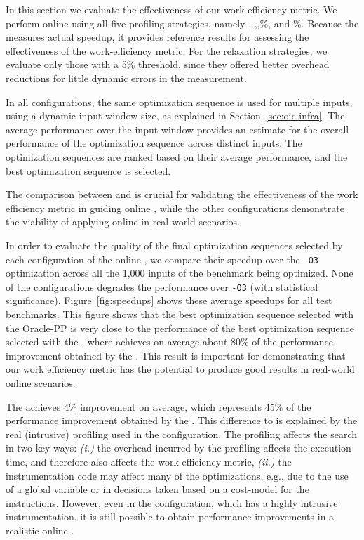In this section we evaluate the effectiveness of our work efficiency metric.
We perform online {\itercomp} using all five profiling strategies, namely
\OracleRM, \OraclePP,\OptProf,\%, and \%.
Because the \OracleRM measures actual speedup, it provides reference results for
assessing the effectiveness of the work-efficiency metric.
For the relaxation strategies, we evaluate only those with a 5\% threshold, since
they offered better overhead reductions for little dynamic errors in the measurement.

In all configurations, the same optimization sequence is used for multiple inputs, using a dynamic input-window size, as explained in
Section~\ref{sec:oic-infra}. The average performance over the input window provides an estimate for the overall performance of the
optimization sequence across distinct inputs. The optimization sequences are ranked based on their average performance, and the best
optimization sequence is selected.

The comparison between \OracleRM and \OraclePP is crucial for validating the
effectiveness of the work efficiency metric in guiding online {\itercomp},
while the other configurations demonstrate the viability of applying online
{\itercomp} in real-world scenarios.

In order to evaluate the quality of the final optimization sequences selected by each configuration of the online {\itercomp}, we compare
their speedup over the \texttt{-O3} optimization across all the 1,000 inputs of the benchmark being optimized. None of the configurations
degrades the performance over \texttt{-O3} (with statistical significance).
Figure~\ref{fig:speedups} shows these average speedups for all test benchmarks.
This figure shows that the best optimization sequence selected with the Oracle-PP
is very close to the performance of the best optimization sequence selected with
the \OracleRM, where \OraclePP achieves on average about 80\% of the performance
improvement obtained by the \OracleRM.
This result is important for demonstrating that our work efficiency metric has
the potential to produce good results in real-world online scenarios.

The \OptProf achieves 4\% improvement on average, which represents 45\% of the
performance improvement obtained by the \OracleRM.
This difference to \OraclePP is explained by the real (intrusive) profiling used
in the \OptProf configuration.
The profiling affects the search in two key ways:
\textit{(i.)} the overhead incurred by the profiling affects the execution time,
and therefore also affects the work efficiency metric,
\textit{(ii.)} the instrumentation code may affect many of the optimizations, e.g.,
due to the use of a global variable or in decisions taken based on a cost-model
for the instructions.
However, even in the \OptProf configuration, which has a highly intrusive instrumentation,
it is still possible to obtain performance improvements in a realistic online
{\itercomp}.


